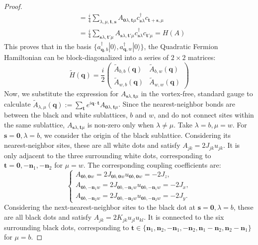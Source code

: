 \begin{proof}
\begin{align*}
&= \frac{i}{4}\sum_{\lambda,\mu,\mathbf t,\mathbf s}A_{\mathbf0\lambda, \mathbf t\mu} c_{\mathbf{s}\lambda}^\dagger c_{\mathbf t+\mathbf{s},\mu} \\
&= \frac{i}{4} \sum_{\mathbf s\lambda, \mathbf t'\mu} A_{\mathbf s\lambda, \mathbf t'\mu} c_{\mathbf s\lambda}^\dagger c_{\mathbf t'\mu} = H(A)
\end{align*}
This proves that in the basis $\{a^{\dagger}_{\mathbf{q}, b}|0\rangle, a^{\dagger}_{\mathbf{q}, w}|0\rangle\}$, the Quadratic Fermion Hamiltonian can be block-diagonalized into a series of $2 \times 2$ matrices:
$$
\tilde H(\mathbf{q}) =\frac{i}{2}\begin{pmatrix}\tilde A_{b,b}(\mathbf{q})&\tilde A_{b,w}(\mathbf{q}) \\ \tilde A_{w,b}(\mathbf{q})&\tilde A_{w,w}(\mathbf{q})\end{pmatrix}
$$
Now, we substitute the expression for $A_{\mathbf s\lambda, \mathbf t\mu}$ in the vortex-free, standard gauge to calculate $\tilde A_{\lambda,\mu}(\mathbf{q}):= \sum_{\mathbf t} e^{i \mathbf q \cdot \mathbf t}A_{\mathbf0\lambda, \mathbf t\mu}$.
Since the nearest-neighbor bonds are between the black and white sublattices, $b$ and $w$, and do not connect sites within the same sublattice, $A_{\mathbf s\lambda, \mathbf t\mu}$ is non-zero only when $\lambda \neq \mu$.
Take $\lambda = b, \mu = w$. For $\mathbf{s} = \mathbf{0}, \lambda = b$, we consider the origin of the black sublattice.
Considering its nearest-neighbor sites, these are all white dots and satisfy $A_{jk} = 2J_{jk}u_{jk}$. It is only adjacent to the three surrounding white dots, corresponding to $\mathbf{t} = \mathbf{0}, -\mathbf{n}_1, -\mathbf{n}_2$ for $\mu = w$.
The corresponding coupling coefficients are:
$$
\begin{cases}
A_{\mathbf 0b, \mathbf 0w}=2J_{\mathbf 0b, \mathbf 0w}u_{\mathbf 0b, \mathbf 0w}=-2J_z, \\
A_{\mathbf 0b, -\mathbf{n}_1 w}=2J_{\mathbf 0b, -\mathbf{n}_1 w}u_{\mathbf 0b, -\mathbf{n}_1 w}=-2J_x, \\
A_{\mathbf 0b, -\mathbf{n}_2w}=2J_{\mathbf 0b, -\mathbf{n}_2w}u_{\mathbf 0b, -\mathbf{n}_2w}=-2J_y.
\end{cases}
$$
Considering the next-nearest-neighbor sites to the black dot at $\mathbf{s} = \mathbf{0}, \lambda = b$, these are all black dots and satisfy $A_{jk} = 2K_{jk}u_{jl} u_{kl}$. It is connected to the six surrounding black dots, corresponding to $\mathbf{t} \in\{ \mathbf{n}_1,\mathbf{n}_2, -\mathbf{n}_1, -\mathbf{n}_2,\mathbf{n}_1 - \mathbf{n}_2,\mathbf{n}_2 - \mathbf{n}_1\}$ for $\mu = b$.

\end{proof}
